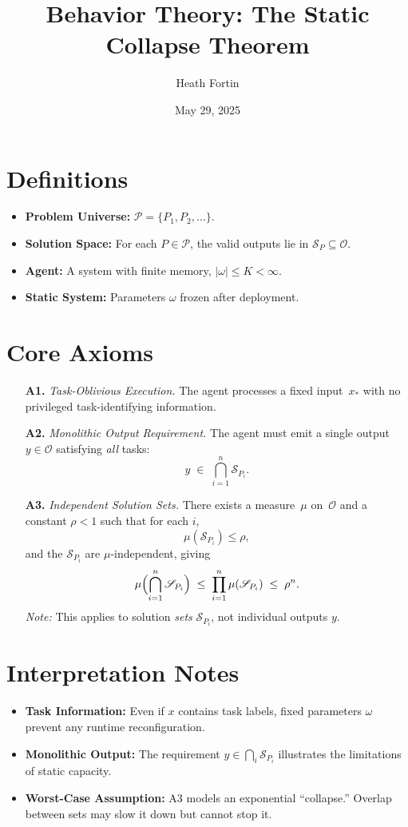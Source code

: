 \documentclass{article}
\newcommand{\Pcal}{\mathscr{P}}
\newcommand{\Scal}{\mathscr{S}}
\newcommand{\Ocal}{\mathscr{O}}
\begin{document}
\title{Behavior Theory: The Static Collapse Theorem}
\author{Heath Fortin}
\date{May 29, 2025}
\maketitle

\section{Definitions}
\begin{itemize}
  \item \textbf{Problem Universe:}  
    $\displaystyle \Pcal = \{P_1, P_2, \dots\}$.
  \item \textbf{Solution Space:}  
    For each $P\in\Pcal$, the valid outputs lie in $\Scal_P\subseteq \Ocal$.
  \item \textbf{Agent:}  
    A system with finite memory, $|\omega|\le K<\infty$.
  \item \textbf{Static System:}  
    Parameters $\omega$ frozen after deployment.
\end{itemize}

\section{Core Axioms}
\begin{enumerate}
  \item[\textbf{A1.}] \emph{Task-Oblivious Execution.}  
    The agent processes a fixed input~$x_*$ with no privileged task-identifying information.
  \item[\textbf{A2.}] \emph{Monolithic Output Requirement.}  
    The agent must emit a single output $y\in\Ocal$ satisfying \emph{all} tasks:
    \[
      y \;\in\; \bigcap_{i=1}^{n}\Scal_{P_i}.
    \]
  \item[\textbf{A3.}] \emph{Independent Solution Sets.}  
    There exists a measure~$\mu$ on~$\Ocal$ and a constant $\rho<1$ such that for each $i$,
    \[
      \mu(\Scal_{P_i})\le\rho,
    \]
    and the $\Scal_{P_i}$ are $\mu$-independent, giving
    \[
      \mu\Bigl(\bigcap_{i=1}^n\Scal_{P_i}\Bigr)
      \;\le\;
      \prod_{i=1}^n \mu(\Scal_{P_i})
      \;\le\;\rho^n.
    \]
    \emph{Note:} This applies to solution \emph{sets} $\Scal_{P_i}$, not individual outputs $y$.
\end{enumerate}

\section{Interpretation Notes}
\begin{itemize}
  \item \textbf{Task Information:}  
    Even if $x$ contains task labels, fixed parameters $\omega$ prevent any runtime reconfiguration.
  \item \textbf{Monolithic Output:}  
    The requirement $y\in\bigcap_i\Scal_{P_i}$ illustrates the limitations of static capacity.
  \item \textbf{Worst-Case Assumption:}  
    A3 models an exponential “collapse.”  Overlap between sets may slow it down but cannot stop it.
\end{itemize}
\end{document}
